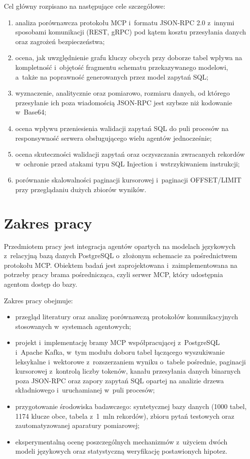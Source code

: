 Cel główny rozpisano na następujące cele szczegółowe:
\begin{enumerate}
    \item analiza porównawcza protokołu MCP i~formatu JSON-RPC 2.0 z~innymi sposobami komunikacji (REST, gRPC) pod kątem kosztu przesyłania danych oraz zagrożeń bezpieczeństwa;
    \item ocena, jak uwzględnienie grafu kluczy obcych przy doborze tabel wpływa na kompletność i~objętość fragmentu schematu przekazywanego modelowi, a~także na poprawność generowanych przez model zapytań SQL;
    \item wyznaczenie, analitycznie oraz pomiarowo, rozmiaru danych, od którego przesyłanie ich poza wiadomością JSON-RPC jest szybsze niż kodowanie w~Base64;
    \item ocena wpływu przeniesienia walidacji zapytań SQL do puli procesów na responsywność serwera obsługującego wielu agentów jednocześnie;
    \item ocena skuteczności walidacji zapytań oraz oczyszczania zwracanych rekordów w~ochronie przed atakami typu SQL Injection i~wstrzykiwaniem instrukcji;
    \item porównanie skalowalności paginacji kursorowej i~paginacji OFFSET/LIMIT przy przeglądaniu dużych zbiorów wyników.
\end{enumerate}


\section{Zakres pracy}
\label{sec:wstep_zakres}

Przedmiotem pracy jest integracja agentów opartych na modelach językowych z~relacyjną bazą danych PostgreSQL o~złożonym schemacie za pośrednictwem protokołu MCP. Obiektem badań jest zaprojektowana i~zaimplementowana na potrzeby pracy brama pośrednicząca, czyli serwer MCP, który udostępnia agentom dostęp do bazy.

Zakres pracy obejmuje:
\begin{itemize}
    \item przegląd literatury oraz analizę porównawczą protokołów komunikacyjnych stosowanych w~systemach agentowych;
    \item projekt i~implementację bramy MCP współpracującej z~PostgreSQL i~Apache Kafka, w~tym modułu doboru tabel łączącego wyszukiwanie leksykalne i~wektorowe z~rozszerzaniem wyniku o~tabele pośrednie, paginacji kursorowej z~kontrolą liczby tokenów, kanału przesyłania danych binarnych poza JSON-RPC oraz zapory zapytań SQL opartej na analizie drzewa składniowego i~uruchamianej w~puli procesów;
    \item przygotowanie środowiska badawczego: syntetycznej bazy danych (1000 tabel, 1174 klucze obce, tabela z~1~mln rekordów), zbioru \wynNQueries{} pytań testowych oraz zautomatyzowanej aparatury pomiarowej;
    \item eksperymentalną ocenę poszczególnych mechanizmów z~użyciem dwóch modeli językowych oraz statystyczną weryfikację postawionych hipotez.
\end{itemize}

